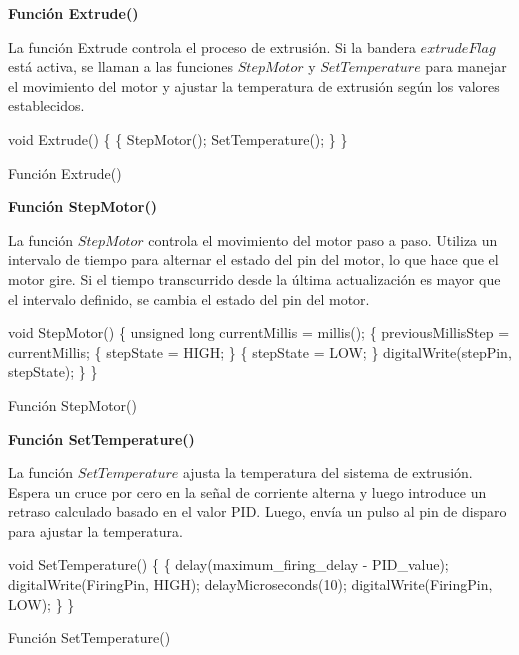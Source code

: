 \documentclass[14pt,oneside]{extarticle} %
\begin{document}
\textbf{Función Extrude()}

La función Extrude controla el proceso de extrusión. Si la bandera $extrudeFlag$ está activa, se llaman a las funciones $StepMotor$ y $SetTemperature$ para manejar el movimiento del motor y ajustar la temperatura de extrusión según los valores establecidos.

\begin{algorithm}[H]
\SetAlgoLined

void Extrude() \{
     \{
        StepMotor(); \;
        SetTemperature(); \;
    \} \;
\} \;

\caption{Función Extrude()}
\label{al:FuncionExtrude}
\end{algorithm}

\textbf{Función StepMotor()}

La función $StepMotor$ controla el movimiento del motor paso a paso. Utiliza un intervalo de tiempo para alternar el estado del pin del motor, lo que hace que el motor gire. Si el tiempo transcurrido desde la última actualización es mayor que el intervalo definido, se cambia el estado del pin del motor.

\begin{algorithm}[H]
\SetAlgoLined

void StepMotor() \{
    unsigned long currentMillis = millis(); \;
     \{
        previousMillisStep = currentMillis; \;
         \{
            stepState = HIGH; \;
        \} \;
        \Else \{
            stepState = LOW; \;
        \} \;
        digitalWrite(stepPin, stepState); \;
    \} \;
\} \;

\caption{Función StepMotor()}
\label{al:FuncionStepMotor}
\end{algorithm}

\textbf{Función SetTemperature()}

La función $SetTemperature$ ajusta la temperatura del sistema de extrusión. Espera un cruce por cero en la señal de corriente alterna y luego introduce un retraso calculado basado en el valor PID. Luego, envía un pulso al pin de disparo para ajustar la temperatura.

\begin{algorithm}[H]
\SetAlgoLined

void SetTemperature() \{
     \{
        delay(maximum\_firing\_delay - PID\_value); \;
        digitalWrite(FiringPin, HIGH); \;
        delayMicroseconds(10); \;
        digitalWrite(FiringPin, LOW); \;
    \} \;
\} \;

\caption{Función SetTemperature()}
\label{al:FuncionSetTemperature}
\end{algorithm}
\end{document}
